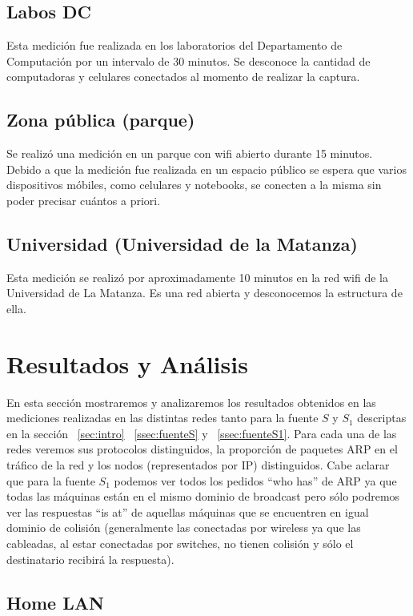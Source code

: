 \documentclass[final,inline,narroweqnarray,a4paper]{ieee}
\begin{document}
\subsection{Labos DC}

Esta medición fue realizada en los laboratorios del Departamento de Computación por un intervalo de 30 minutos. Se desconoce la cantidad de computadoras y celulares conectados al momento de realizar la captura.

\subsection{Zona pública (parque)}
Se realizó una medición en un parque con wifi abierto durante 15 minutos. Debido a que la medición fue realizada en un espacio público se espera que varios dispositivos móbiles, como celulares y notebooks, se conecten a la misma sin poder precisar cuántos a priori.

\subsection{Universidad (Universidad de la Matanza)}
Esta medición se realizó por aproximadamente 10 minutos en la red wifi de la Universidad de La Matanza. Es una red abierta y desconocemos la estructura de ella.

\section{Resultados y Análisis}
En esta sección mostraremos y analizaremos los resultados obtenidos en las mediciones realizadas en las distintas redes tanto para la fuente $S$ y $S_1$ descriptas en la sección ~\ref{sec:intro} ~\ref{ssec:fuenteS} y ~\ref{ssec:fuenteS1}. Para cada una de las redes veremos sus protocolos distinguidos, la proporción de paquetes ARP en el tráfico de la red y los nodos (representados por IP) distinguidos. Cabe aclarar que para la fuente $S_1$ podemos ver todos los pedidos ``who has'' de ARP ya que todas las máquinas están en el mismo dominio de broadcast pero sólo podremos ver las respuestas ``is at'' de aquellas máquinas que se encuentren en igual dominio de colisión (generalmente las conectadas por wireless ya que las cableadas, al estar conectadas por switches, no tienen colisión y sólo el destinatario recibirá la respuesta). 

\subsection{Home LAN}
\end{document}
